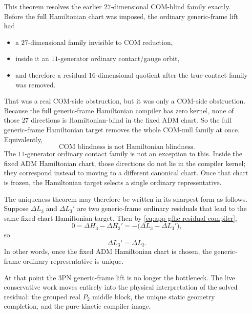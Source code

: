 \documentclass[11pt]{article}
\begin{document}
This theorem resolves the earlier $27$-dimensional COM-blind family exactly.
Before the full Hamiltonian chart was imposed, the ordinary generic-frame lift
had
\begin{itemize}
    \item a $27$-dimensional family invisible to COM reduction,
    \item inside it an $11$-generator ordinary contact/gauge orbit,
    \item and therefore a residual $16$-dimensional quotient after the true
    contact family was removed.
\end{itemize}
That was a real COM-side obstruction, but it was only a COM-side obstruction.
Because the full generic-frame Hamiltonian compiler has zero kernel, none of
those $27$ directions is Hamiltonian-blind in the fixed ADM chart.  So the full
generic-frame Hamiltonian target removes the whole COM-null family at once.
Equivalently,
\begin{equation}
\boxed{\text{COM blindness is not Hamiltonian blindness.}}
\label{eq:app-gfhc-com-blind-not-hamiltonian-blind}
\end{equation}
The $11$-generator ordinary contact family is not an exception to this.  Inside
the fixed ADM Hamiltonian chart, those directions do not lie in the compiler
kernel; they correspond instead to moving to a different canonical chart.
Once that chart is frozen, the Hamiltonian target selects a single ordinary
representative.

The uniqueness theorem may therefore be written in its sharpest form as
follows.  Suppose $\Delta L_3$ and $\Delta L_3'$ are two generic-frame ordinary
residuals that lead to the same fixed-chart Hamiltonian target.  Then by
\eqref{eq:app-gfhc-residual-compiler},
\begin{equation}
0=\Delta H_3-\Delta H_3'=-\bigl(\Delta L_3-\Delta L_3'\bigr),
\label{eq:app-gfhc-uniqueness-proof}
\end{equation}
so
\begin{equation}
\boxed{\Delta L_3'=\Delta L_3.}
\label{eq:app-gfhc-ordinary-uniqueness}
\end{equation}
In other words, once the fixed ADM Hamiltonian chart is chosen, the generic-
frame ordinary representative is unique.

At that point the $3$PN generic-frame lift is no longer the bottleneck.  The
live conservative work moves entirely into the physical interpretation of the
solved residual: the grouped real $P_2$ middle block, the unique static
geometry completion, and the pure-kinetic compiler image.
\end{document}
